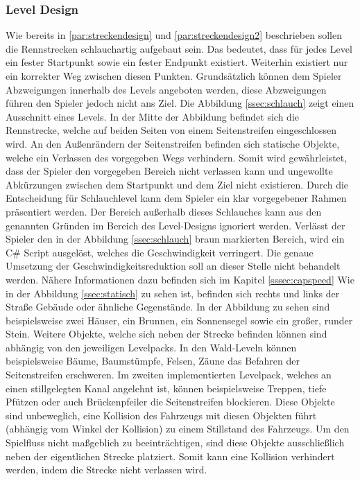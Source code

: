 	\subsubsection{Level Design}
		Wie bereits in \ref{par:streckendesign} und \ref{par:streckendesign2} beschrieben sollen die Rennstrecken schlauchartig aufgebaut sein. Das bedeutet, dass für jedes Level ein fester Startpunkt sowie ein fester Endpunkt existiert. Weiterhin existiert nur ein korrekter Weg zwischen diesen Punkten. Grundsätzlich können dem Spieler Abzweigungen innerhalb des Levels angeboten werden, diese Abzweigungen führen den Spieler jedoch nicht ans Ziel.
		Die Abbildung \ref{ssec:schlauch} zeigt einen Ausschnitt eines Levels. In der Mitte der Abbildung befindet sich die Rennstrecke, welche auf beiden Seiten von einem Seitenstreifen eingeschlossen wird. An den Außenrändern der Seitenstreifen befinden sich statische Objekte, welche ein Verlassen des vorgegeben Wegs verhindern. Somit wird gewährleistet, dass der Spieler den vorgegeben Bereich nicht verlassen kann und ungewollte Abkürzungen zwischen dem Startpunkt und dem Ziel nicht existieren. Durch die Entscheidung für Schlauchlevel kann dem Spieler ein klar vorgegebener Rahmen präsentiert werden. Der Bereich außerhalb dieses Schlauches kann aus den genannten Gründen im Bereich des Level-Designs ignoriert werden. Verlässt der Spieler den in der Abbildung \ref{ssec:schlauch} braun markierten Bereich, wird ein C\# Script ausgelöst, welches die Geschwindigkeit verringert. Die genaue Umsetzung der Geschwindigkeitsreduktion soll an dieser Stelle nicht behandelt werden. Nähere Informationen dazu befinden sich im Kapitel \ref{sssec:capspeed}
		Wie in der Abbildung \ref{ssec:statisch} zu sehen ist, befinden sich rechts und links der Straße Gebäude oder ähnliche Gegenstände. In der Abbildung zu sehen sind beispielsweise zwei Häuser, ein Brunnen, ein Sonnensegel sowie ein großer, runder Stein. Weitere Objekte, welche sich neben der Strecke befinden können sind abhängig von den jeweiligen Levelpacks. In den Wald-Leveln können beispielsweise Bäume, Baumstümpfe, Felsen, Zäune das Befahren der Seitenstreifen erschweren. Im zweiten implementierten Levelpack, welches an einen stillgelegten Kanal angelehnt ist, können beispielsweise Treppen, tiefe Pfützen oder auch Brückenpfeiler die Seitenstreifen blockieren. Diese Objekte sind unbeweglich, eine Kollision des Fahrzeugs mit diesen Objekten führt (abhängig vom Winkel der Kollision) zu einem Stillstand des Fahrzeugs. Um den Spielfluss nicht maßgeblich zu beeinträchtigen, sind diese Objekte ausschließlich neben der eigentlichen Strecke platziert. Somit kann eine Kollision verhindert werden, indem die Strecke nicht verlassen wird.
